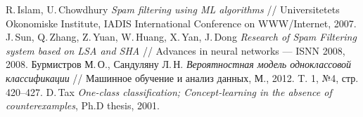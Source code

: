 \documentclass[12pt,a4paper,oneside]{article}
\begin{document}
\begin{thebibliography}{99}
	 R.\,Islam, U.\,Chowdhury \textit{Spam filtering using ML algorithms} // Universitetets Okonomiske Institute, IADIS International Conference on WWW/Internet, 2007.
	 J.\,Sun, Q.\,Zhang, Z.\,Yuan, W.\,Huang, X.\,Yan, J.\,Dong \textit{Research of Spam Filtering system based on LSA and SHA} // Advances in neural networks --- ISNN 2008, 2008.
	 Бурмистров М.\,О., Сандуляну Л.\,Н. \textit{Вероятностная модель одноклассовой классификации} // Машинное обучение и анализ данных, М., 2012. T. 1, №4, стр. 420--427.
	 D.\,Tax \textit{One-class classification; Concept-learning in the absence of
	counterexamples}, Ph.D thesis, 2001.
\end{thebibliography}
\end{document}
